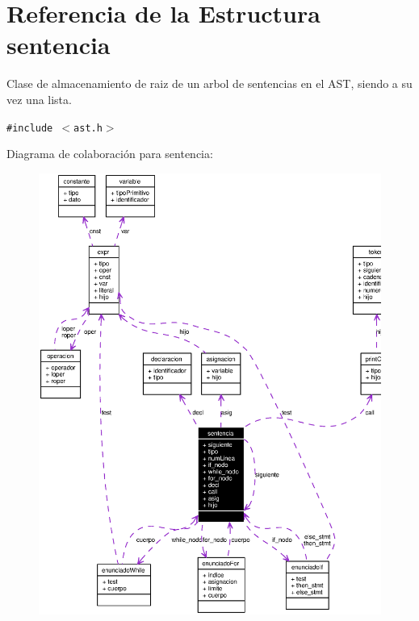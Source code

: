 \section{Referencia de la Estructura sentencia}
\label{structsentencia}
Clase de almacenamiento de raiz de un arbol de sentencias en el AST, siendo a su vez una lista.  


{\tt \#include $<$ast.h$>$}

Diagrama de colaboraci\'{o}n para sentencia:\begin{figure}[H]
\begin{center}
\leavevmode
\includegraphics[width=343pt]{structsentencia__coll__graph}
\end{center}
\end{figure}
